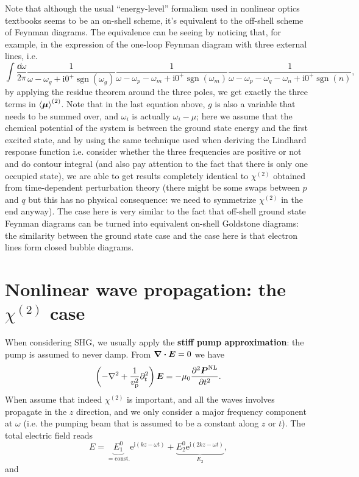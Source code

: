 \documentclass[hyperref, a4paper]{article}
\DeclareMathOperator{\sgn}{sgn}
\newcommand*{\ii}{\mathrm{i}}
\newcommand*{\ee}{\mathrm{e}}
\newcommand*{\const}{\mathrm{const}}
\newcommand*{\concept}[1]{{\textbf{#1}}}
\newcommand*{\vp}{v_{\text{p}}}
\newcommand*{\chitwo}{\chi^{(2)}}
\begin{document}
Note that although the usual ``energy-level'' formalism 
used in nonlinear optics textbooks 
seems to be an on-shell scheme, 
it's equivalent to the off-shell scheme of Feynman diagrams.
The equivalence can be seeing by noticing that, 
for example, in the expression of the one-loop Feynman diagram with three external lines, i.e.
\begin{equation}
    \int \frac{\dd{\omega}}{2\pi} \frac{1}{\omega - \omega_g + \ii 0^+ \sgn(\omega_g)} \frac{1}{\omega - \omega_p - \omega_m + \ii 0^+ \sgn(\omega_m)} \frac{1}{\omega - \omega_p - \omega_q - \omega_n + \ii 0^+ \sgn(n)} ,
\end{equation}
by applying the residue theorem around the three poles,
we get exactly the three terms in $\expval{\vb*{\mu}}^{(2)}$.
Note that in the last equation above, 
$g$ is also a variable that needs to be summed over, 
and $\omega_i$ is actually $\omega_i - \mu$; 
here we assume that the chemical potential of the system is between 
the ground state energy and the first excited state, 
and by using the same technique used when deriving the Lindhard response function
i.e. consider whether the three frequencies are positive or not 
and do contour integral (and also pay attention to the fact that there is only one occupied state),
we are able to get results completely identical to 
$\chi^{(2)}$ obtained from time-dependent perturbation theory 
(there might be some swaps between $p$ and $q$ 
but this has no physical consequence: 
we need to symmetrize $\chi^{(2)}$ in the end anyway).
The case here is very similar to the fact that 
off-shell ground state Feynman diagrams can be turned into equivalent 
on-shell Goldstone diagrams:
the similarity between the ground state case and the case here 
is that electron lines form closed bubble diagrams.

\section{Nonlinear wave propagation: the $\chitwo$ case}

When considering SHG, we usually apply the \concept{stiff pump approximation}: 
the pump is assumed to never damp.
From $\div{\vb*{E}} = 0$ we have 
\begin{equation}
    \left(
        - \laplacian + \frac{1}{\vp^2} \partial_t^2 
    \right) \vb*{E} = - \mu_0 \pdv[2]{\vb*{P}^{\text{NL}}}{t}.
\end{equation}
When assume that indeed $\chitwo$ is important, 
and all the waves involves propagate in the $z$ direction,
and we only consider a major frequency component at $\omega$
(i.e. the pumping beam that is assumed to be a constant along $z$ or $t$).
The total electric field reads 
\begin{equation}
    E = \underbrace{E_1^0}_{= \const.} \ee^{\ii (kz - \omega t)}
    + \underbrace{E_2^0 \ee^{\ii (2 k z - \omega t)}}_{E_2},
\end{equation}
and 
\end{document}
